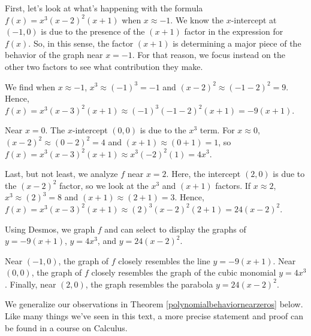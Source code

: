 \documentclass{ximera}
\begin{document}

First, let's look at what's happening with the formula  $f(x) =  x^3 (x-2)^2 (x+1)$  when  $x  \approx  -1$.   We know the $x$-intercept at $(-1,0)$ is due to the presence of the $(x+1)$ factor in the expression for $f(x)$.  So, in this sense, the factor $(x+1)$ is determining a major piece of the behavior of the graph near $x = -1$.   For that reason, we focus instead on the other two factors to see what contribution they make. 


We find when $x \approx -1$,  $x^3  \approx  (-1)^3 = -1$ and $(x-2)^2 \approx (-1-2)^2 = 9$.  Hence, $f(x) = x^3 (x-3)^2 (x+1) \approx (-1)^3 (-1-2)^2 (x+1) = -9(x+1)$. 


Near $x = 0$.  The $x$-intercept $(0,0)$ is due to the $x^3$ term.  For $x \approx 0$, $(x-2)^2 \approx (0-2)^2 = 4$ and $(x+1) \approx (0+1) = 1$, so $f(x) =  x^3 (x-3)^2 (x+1) \approx x^3 (-2)^2(1) = 4x^3$.


Last, but not least, we analyze $f$ near $x = 2$.  Here, the intercept $(2,0)$ is due to the $(x-2)^2$ factor, so we look at the $x^3$ and $(x+1)$ factors.  If $x \approx 2$, $x^3 \approx (2)^3 = 8$ and $(x+1) \approx (2+1) = 3$.  Hence,  $f(x) =  x^3 (x-3)^2 (x+1) \approx (2)^3 (x-2)^2 (2+1) = 24(x-2)^2$. 

Using Desmos, we graph $f$ and can select to display the graphs of $y=-9(x+1)$, $y = 4x^3$, and $y=24(x-2)^2$.  




\begin{center}
\end{center}

Near $(-1,0)$, the graph of $f$ closely resembles the line $y = -9(x+1)$.  Near $(0,0)$, the graph of $f$ closely resembles the graph of the cubic monomial $y = 4x^3$.  Finally, near $(2,0)$, the graph resembles the parabola $y=24(x-2)^2$. 

We generalize our observations in Theorem \ref{polynomialbehaviornearzeros} below. Like many things we've seen in this text, a more precise statement and proof can be found in a course on Calculus.


\end{document}
